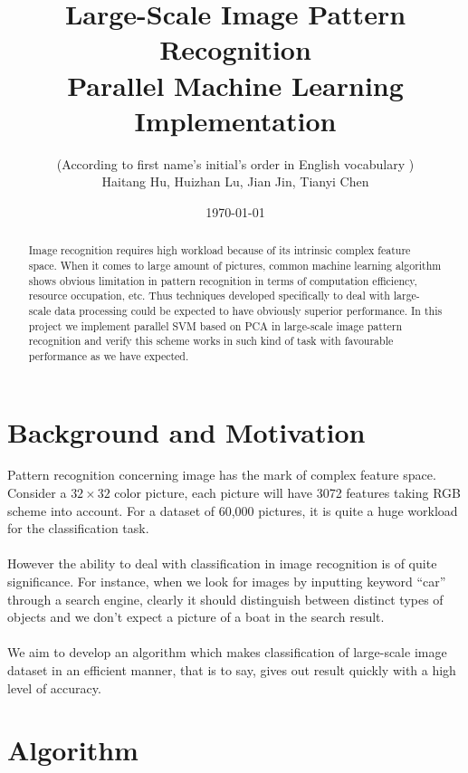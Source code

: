 \documentclass[a4paper]{article}
\title{Large-Scale Image Pattern Recognition\\
Parallel Machine Learning Implementation}
\author{(According to first name's initial's order in English vocabulary )\\
Haitang Hu, Huizhan Lu, Jian Jin, Tianyi Chen}
\date{\today}
\begin{document}
\maketitle

\begin{abstract}
Image recognition requires high workload because of its intrinsic complex feature space. When it comes to large amount of pictures, common machine learning algorithm shows obvious limitation in pattern recognition in terms of computation efficiency, resource occupation, etc. Thus techniques developed specifically to deal with large-scale data processing could be expected to have obviously superior performance. In this project we implement parallel SVM based on PCA in large-scale image pattern recognition and verify this scheme works in such kind of task with favourable performance as we have expected. 
\end{abstract}

\section{Background and Motivation}
Pattern recognition concerning image has the mark of complex feature space. Consider a $32\times 32$ color picture, each picture will have 3072 features taking RGB scheme into account. For a dataset of 60,000 pictures, it is quite a huge workload for the classification task.\\
\\
However the ability to deal with classification in image recognition is of quite significance. For instance, when we  look for images by inputting keyword ``car'' through a search engine, clearly it should distinguish between distinct types of objects and we don't expect a picture of a boat in the search result.\\
\\
We aim to develop an algorithm which makes classification of large-scale image dataset in an efficient manner, that is to say, gives out result quickly with a high level of accuracy. 
\section{Algorithm}
\end{document}
